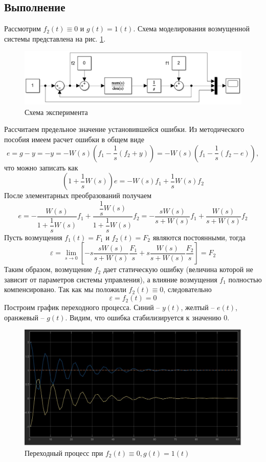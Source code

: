 \documentclass[a4paper, 12pt]{article}
\begin{document}
    \subsection{Выполнение}
    Рассмотрим $f_2(t)\equiv0$ и $g(t)=1(t)$. Схема моделирования возмущенной системы
    представлена на рис. \ref{fig:scheme3_1}.
    \begin{figure}[H]
        \centering
        \includegraphics[scale=0.6]{scheme3_1.png}
        \captionsetup{skip=0pt}
        \caption{Схема эксперимента}
        \label{fig:scheme3_1}
    \end{figure}
    \noindent Рассчитаем предельное значение установившейся ошибки. Из методического пособия имеем расчет ошибки в общем виде
    $$e=g-y=-y=-W(s)\left(f_1-\dfrac{1}{s}\left(f_2+y\right)\right)=-W(s)\left(f_1-\dfrac{1}{s}\left(f_2-e\right)\right),$$
    что можно записать как
    $$\left(1+\dfrac{1}{s}W(s)\right)e=-W(s)f_1+\dfrac{1}{s}W(s)f_2$$
    После элементарных преобразований получаем
    $$e=-\dfrac{W(s)}{1+\dfrac{1}{s}W(s)}f_1+\dfrac{\dfrac{1}{s}W(s)}{1+\dfrac{1}{s}W(s)}f_2=-\dfrac{sW(s)}{s+W(s)}f_1+\dfrac{W(s)}{s+W(s)}f_2$$
    Пусть возмущения $f_1(t)=F_1$ и $f_2(t)=F_2$ являются постоянными, тогда
    $$\varepsilon=\lim\limits_{s\rightarrow0}\left[-s\dfrac{sW(s)}{s+W(s)}\dfrac{F_1}{s}+s\dfrac{W(s)}{s+W(s)}\dfrac{F_2}{s}\right]=F_2$$
    Таким образом, возмущение $f_2$ дает статическую ошибку (величина которой не
    зависит от параметров системы управления), а влияние возмущения $f_1$ полностью компенсировано.
    Так как мы положили $f_2(t)\equiv0$, следовательно $$\varepsilon=f_2(t)=0$$
    Построим график переходного процесса. Синий -- $y(t)$, желтый -- $e(t)$, оранжевый -- $g(t)$.
    Видим, что ошибка стабилизируется к значению 0.
    \begin{figure}[H]
        \centering
        \includegraphics[scale=0.3]{task_3_f2=0.jpg}
        \captionsetup{skip=0pt}
        \caption{Переходный процесс при $f_2(t)\equiv0,g(t)=1(t)$}
        \label{fig:t3f2eq0}
    \end{figure}
\end{document}

